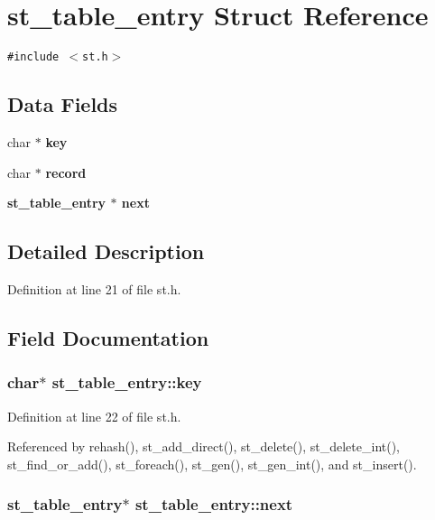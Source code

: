 \section{st\_\-table\_\-entry Struct Reference}
\label{structst__table__entry}
{\tt \#include $<$st.h$>$}

\subsection*{Data Fields}
\begin{CompactItemize}
\item 
char $\ast$ \bf{key}
\item 
char $\ast$ \bf{record}
\item 
\bf{st\_\-table\_\-entry} $\ast$ \bf{next}
\end{CompactItemize}


\subsection{Detailed Description}




Definition at line 21 of file st.h.

\subsection{Field Documentation}
\subsubsection{\setlength{\rightskip}{0pt plus 5cm}char$\ast$ \bf{st\_\-table\_\-entry::key}}\label{structst__table__entry_cc9640c0f32ceb25ca51446d93fc4495}




Definition at line 22 of file st.h.

Referenced by rehash(), st\_\-add\_\-direct(), st\_\-delete(), st\_\-delete\_\-int(), st\_\-find\_\-or\_\-add(), st\_\-foreach(), st\_\-gen(), st\_\-gen\_\-int(), and st\_\-insert().
\subsubsection{\setlength{\rightskip}{0pt plus 5cm}\bf{st\_\-table\_\-entry}$\ast$ \bf{st\_\-table\_\-entry::next}}\label{structst__table__entry_8c7fef89f13d76633cd71d595d39181d}




